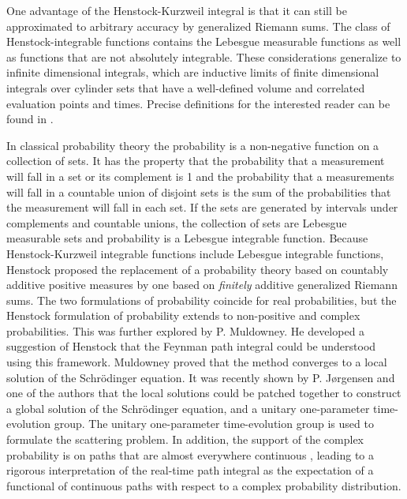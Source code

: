 \documentclass[aps,prc,reprint,noshowpacs,groupedaddress,onecolumn]{revtex4}
\begin{document}
One advantage of the Henstock-Kurzweil integral is that it can still
be approximated to arbitrary accuracy by generalized Riemann sums.
The class of Henstock-integrable functions contains the Lebesgue
measurable functions as well as functions that are not absolutely
integrable.  These considerations generalize to infinite dimensional
integrals, which are inductive limits of finite dimensional integrals
over cylinder sets that have a well-defined volume and correlated
evaluation points and times.  Precise definitions for the interested
reader can be found in \cite{Muldowney}\cite{Katya_1}\cite{Katya_2}.


In classical probability theory the probability is a non-negative
function on a collection of sets.  It has the property that the
probability that a measurement will fall in a set or its complement is
1 and the probability that a measurements will fall in a countable
union of disjoint sets is the sum of the probabilities that the
measurement will fall in each set.  If the sets are generated by
intervals under complements and countable unions, the collection of
sets are Lebesgue measurable sets and probability is a Lebesgue
integrable function.  Because Henstock-Kurzweil integrable functions
include Lebesgue integrable functions, Henstock proposed the
replacement of a probability theory based on countably additive
positive measures by one based on {\it finitely} additive generalized
Riemann sums.  The two formulations of probability coincide for real
probabilities, but the Henstock formulation of probability extends to
non-positive and complex probabilities.  This was further explored by
P. Muldowney.  He developed a suggestion of Henstock that the Feynman
path integral could be understood using this framework.  Muldowney
\cite{Muldowney} proved that the method converges to a local solution
of the Schr\"odinger equation.  It was recently shown by
P. J{\o}rgensen and one of the authors \cite{Katya_1}\cite{Katya_2}
that the local solutions could be patched together to construct a
global solution of the Schr\"odinger equation, and a unitary
one-parameter time-evolution group.  The unitary one-parameter
time-evolution group is used to formulate the scattering problem.  In
addition, the support of the complex probability is on paths that are
almost everywhere continuous \cite{Katya_2}, leading to a rigorous
interpretation of the real-time path integral as the expectation of a functional
of continuous paths with respect to a complex probability
distribution.
\end{document}
